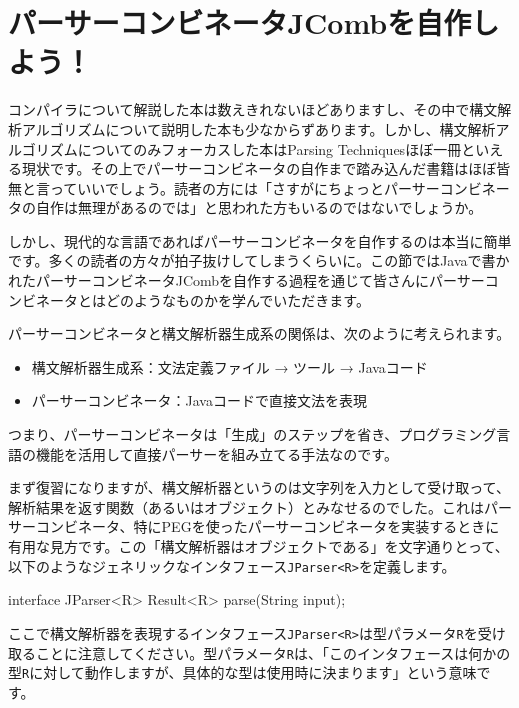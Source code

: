 \section{パーサーコンビネータJCombを自作しよう！}

コンパイラについて解説した本は数えきれないほどありますし、その中で構文解析アルゴリズムについて説明した本も少なからずあります。しかし、構文解析アルゴリズムについてのみフォーカスした本はParsing Techniquesほぼ一冊といえる現状です。その上でパーサーコンビネータの自作まで踏み込んだ書籍はほぼ皆無と言っていいでしょう。読者の方には「さすがにちょっとパーサーコンビネータの自作は無理があるのでは」と思われた方もいるのではないでしょうか。

しかし、現代的な言語であればパーサーコンビネータを自作するのは本当に簡単です。多くの読者の方々が拍子抜けしてしまうくらいに。この節ではJavaで書かれたパーサーコンビネータJCombを自作する過程を通じて皆さんにパーサーコンビネータとはどのようなものかを学んでいただきます。

パーサーコンビネータと構文解析器生成系の関係は、次のように考えられます。

\begin{itemize}
\item
  構文解析器生成系：文法定義ファイル → ツール → Javaコード
\item
  パーサーコンビネータ：Javaコードで直接文法を表現
\end{itemize}

つまり、パーサーコンビネータは「生成」のステップを省き、プログラミング言語の機能を活用して直接パーサーを組み立てる手法なのです。

まず復習になりますが、構文解析器というのは文字列を入力として受け取って、解析結果を返す関数（あるいはオブジェクト）とみなせるのでした。これはパーサーコンビネータ、特にPEGを使ったパーサーコンビネータを実装するときに有用な見方です。この「構文解析器はオブジェクトである」を文字通りとって、以下のようなジェネリックなインタフェース\texttt{JParser\textless{}R\textgreater{}}を定義します。

\begin{codescreen}{}
interface JParser<R> {
  Result<R> parse(String input);
}
\end{codescreen}

ここで構文解析器を表現するインタフェース\texttt{JParser\textless{}R\textgreater{}}は型パラメータ\texttt{R}を受け取ることに注意してください。型パラメータ\texttt{R}は、「このインタフェースは何かの型\texttt{R}に対して動作しますが、具体的な型は使用時に決まります」という意味です。


